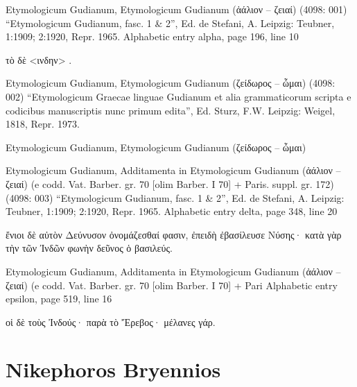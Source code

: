 \documentclass[12pt,letterpaper,twoside,final]{memoir}
\begin{document}
\begin{greek}

Etymologicum Gudianum, Etymologicum Gudianum (ἀάλιον – ζειαί) (4098: 001)
“Etymologicum Gudianum, fasc. 1 \& 2”, Ed. de Stefani, A.
Leipzig: Teubner, 1:1909; 2:1920, Repr. 1965.
Alphabetic entry alpha, page 196, line 10

                 τὸ δὲ <ινδην> . 



Etymologicum Gudianum, Etymologicum Gudianum (ζείδωρος – ὦμαι) (4098: 002)
“Etymologicum Graecae linguae Gudianum et alia grammaticorum scripta e codicibus manuscriptis nunc primum edita”, Ed. Sturz, F.W.
Leipzig: Weigel, 1818, Repr. 1973.



Etymologicum Gudianum, Etymologicum Gudianum (ζείδωρος – ὦμαι) 




Etymologicum Gudianum, Additamenta in Etymologicum Gudianum (ἀάλιον – ζειαί) (e codd. Vat. Barber. gr. 70 [olim Barber. I 70] + Paris. suppl. gr. 172) (4098: 003)
“Etymologicum Gudianum, fasc. 1 \& 2”, Ed. de Stefani, A.
Leipzig: Teubner, 1:1909; 2:1920, Repr. 1965.
Alphabetic entry delta, page 348, line 20

                       ἔνιοι δὲ αὐτὸν Δεύνυσον ὀνομάζεσθαί φασιν, ἐπειδὴ ἐβασίλευσε 
Νύσης· κατὰ γὰρ τὴν τῶν Ἰνδῶν φωνὴν δεῦνος ὁ βασιλεύς. 

Etymologicum Gudianum, Additamenta in Etymologicum Gudianum (ἀάλιον – ζειαί) (e codd. Vat. Barber. gr. 70 [olim Barber. I 70] + Pari 
Alphabetic entry epsilon, page 519, line 16

                                                                                      οἱ 
δὲ τοὺς Ἰνδούς· παρὰ τὸ Ἔρεβος· μέλανες γάρ. 

\end{greek}



\section{Nikephoros Bryennios}
\end{document}

